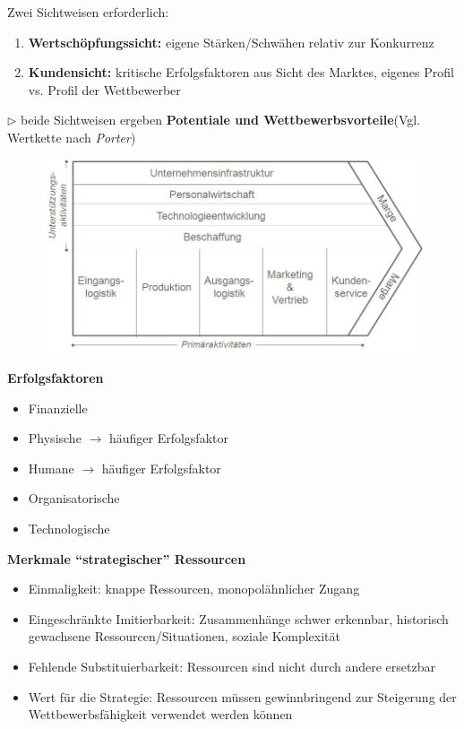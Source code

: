 \documentclass[a4paper,11pt, twoside]{article}
\newcommand\mpar[1]{\marginpar {\flushleft\small #1}}
\begin{document}
Zwei Sichtweisen erforderlich:
\begin{enumerate}
	\item \textbf{Wertschöpfungssicht:} eigene Stärken/Schwähen relativ zur Konkurrenz
	\item \textbf{Kundensicht:} kritische Erfolgsfaktoren aus Sicht des Marktes, eigenes Profil vs. Profil der Wettbewerber
\end{enumerate}
$\triangleright$ beide Sichtweisen ergeben \textbf{Potentiale und Wettbewerbsvorteile}(Vgl. Wertkette nach \textit{Porter})
	\mpar{\textcolor{red}{Abschätzung der eigenen preislichen Lage auf dem Markt}}

\begin{figure}[h]
 \begin{center}
   \includegraphics[scale=0.3]{bilder/Wertkette.jpg}
 \end{center}
\end{figure}

\textbf{Erfolgsfaktoren}
\begin{itemize}
	\item Finanzielle
	\item Physische $\rightarrow$ häufiger Erfolgsfaktor
	\item Humane $\rightarrow$ häufiger Erfolgsfaktor
	\mpar{\textcolor{red}{Monopolstellung bei vorhanden Ressourcen ist immer wertvoll!}}
	\item Organisatorische
	\item Technologische
\end{itemize}
\mpar{\textcolor{red}{Ressourcen die jeder hat, sind nicht wertvoll!}}

\textbf{Merkmale "`strategischer"' Ressourcen}
\begin{itemize}
	\item Einmaligkeit: knappe Ressourcen, monopolähnlicher Zugang  
	\item Eingeschränkte Imitierbarkeit: Zusammenhänge schwer erkennbar, historisch gewachsene Ressourcen/Situationen, soziale Komplexität	
	\item Fehlende Substituierbarkeit: Ressourcen sind nicht durch andere ersetzbar
	\item Wert für die Strategie: Ressourcen müssen gewinnbringend zur Steigerung der Wettbewerbsfähigkeit verwendet werden können
\end{itemize}
\end{document}

